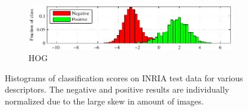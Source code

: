 \documentclass[thesis.tex]{subfiles}
\begin{document}
\begin{figure}
\begin{subfigure}[t]{\textwidth}
	\end{subfigure}
	\begin{subfigure}[t]{\textwidth}
		\includegraphics[width=\textwidth]{img/inriaHistogramHog.pdf}
		\caption{HOG}
		\label{fig:inriaHistogramHog}
	\end{subfigure}
	\caption{Histograms of classification scores on INRIA test data for various descriptors. The negative and positive results are individually normalized due to the large skew in amount of images.}
	\label{fig:inriaHistogram}
\end{figure}
%
\subbibliography
\end{document}

